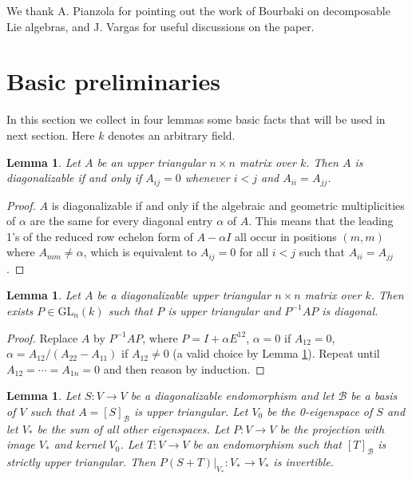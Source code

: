 \documentclass{amsart}
\newtheorem{lemma}[theorem]{Lemma}
\theoremstyle{definition}
\theoremstyle{remark}
\numberwithin{equation}{section}
\newcommand \B{{\mathcal B}}
\newcommand \GL{{\mathrm {GL}}}
\begin{document}
We thank A. Pianzola for pointing out the work of Bourbaki on decomposable Lie algebras,
and J. Vargas for useful discussions on the paper.



\section{Basic preliminaries}
In this section we collect in four lemmas some basic facts that will be used in next section. Here $k$ denotes an arbitrary field.

\medskip

\begin{lemma}\label{Lemma 1.}
 Let $A$ be an upper triangular $n\times n$ matrix over $k$. Then $A$ is diagonalizable
if and only if $A_{ij}=0$ whenever $i<j$ and $A_{ii}=A_{jj}$.
\end{lemma}

\begin{proof}
  $A$ is diagonalizable if and only if the algebraic and geometric
multiplicities of $\alpha$
are the same for every diagonal entry $\alpha$ of $A$.
This means that the leading 1's of the reduced row echelon
form of $A-\alpha I$ all occur in positions $(m,m)$ where
$A_{mm}\neq \alpha$, which is equivalent to $A_{ij}=0$ for all $i<j$ such that $A_{ii}=A_{jj}$.
\end{proof}



\begin{lemma}\label{Lemma 2.}
 Let $A$ be a diagonalizable upper triangular $n\times n$ matrix over $k$.
Then exists $P\in\GL_n(k)$ such that $P$ is upper triangular and $P^{-1}AP$ is diagonal.
\end{lemma}

\begin{proof}
 Replace $A$ by $P^{-1}AP$, where $P=I+\alpha E^{12}$, $\alpha=0$ if $A_{12}=0$,
$\alpha=A_{12}/(A_{22}-A_{11})$ if $A_{12}\neq 0$ (a valid choice by Lemma \ref{Lemma 1.}).
Repeat until $A_{12}=\cdots=A_{1n}=0$ and then reason by induction.
\end{proof}



\begin{lemma}\label{Lemma 3.}
 Let $S:V\to V$ be a diagonalizable endomorphism and let $\B$ be a basis of $V$
such that $A=[S]_\B$ is upper triangular. Let $V_0$ be the 0-eigenspace of $S$
and let $V_*$ be the sum of all other eigenspaces. Let $P:V\to V$ be the projection
with image $V_*$ and kernel $V_0$.
Let $T:V\to V$ be an endomorphism such that $[T]_\B$ is strictly upper triangular.
Then $P(S+T)\vert_{V_*}:V_*\to V_*$
is invertible.
\end{lemma}
\end{document}
